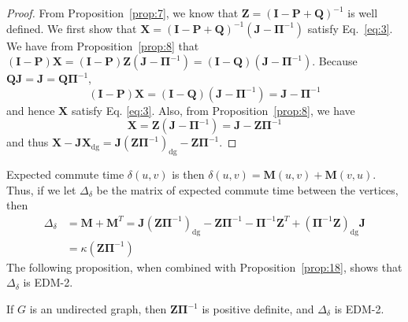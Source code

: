 \begin{proof}
  From Proposition~\ref{prop:7}, we know that $\mathbf{Z} =
  (\mathbf{I} - \mathbf{P} + \mathbf{Q})^{-1}$ is well defined.  We
  first show that $\mathbf{X} = (\mathbf{I} - \mathbf{P} +
  \mathbf{Q})^{-1}(\mathbf{J} - \bm{\Pi}^{-1})$ satisfy
  Eq.~\eqref{eq:3}. We have from Proposition~\ref{prop:8} that
  $(\mathbf{I} - \mathbf{P})\mathbf{X} = (\mathbf{I} -
  \mathbf{P})\mathbf{Z}(\mathbf{J} - \bm{\Pi}^{-1}) = (\mathbf{I} -
  \mathbf{Q})(\mathbf{J} - \bm{\Pi}^{-1})$. Because 
  $\mathbf{Q}\mathbf{J} = \mathbf{J} = \mathbf{Q}\bm{\Pi}^{-1}$,
  \begin{equation}
    \label{eq:27}
    (\mathbf{I} - \mathbf{P})\mathbf{X} =(\mathbf{I} - \mathbf{Q})(\mathbf{J} -
  \bm{\Pi}^{-1}) = \mathbf{J} - \bm{\Pi}^{-1}
  \end{equation}
  and hence $\mathbf{X}$ satisfy Eq. \eqref{eq:3}. Also, from
  Proposition~\ref{prop:8}, we have
  \begin{equation}
    \label{eq:31}
    \mathbf{X} = \mathbf{Z}(\mathbf{J} - \bm{\Pi}^{-1}) = \mathbf{J} -
    \mathbf{Z}\bm{\Pi}^{-1}
  \end{equation}
  and thus $\mathbf{X} - \mathbf{J}\mathbf{X}_{\mathrm{dg}} =
  \mathbf{J}(\mathbf{Z}\bm{\Pi}^{-1})_{\mathrm{dg}} - \mathbf{Z}\bm{\Pi}^{-1}$. 
\end{proof}
Expected commute time $\delta(u,v)$ is then 
$\delta(u,v) = \mathbf{M}(u,v)
+ \mathbf{M}(v,u)$. Thus, if we let $\Delta_{\delta}$ be the
matrix of expected commute time between the vertices, then
\begin{equation}
  \label{eq:52}
  \begin{split}
    \Delta_\delta &= \mathbf{M} + \mathbf{M}^{T}
    = 
    \mathbf{J}(\mathbf{Z}\bm{\Pi}^{-1})_{\mathrm{dg}} - \mathbf{Z}\bm{\Pi}^{-1} -
    \bm{\Pi}^{-1}\mathbf{Z}^{T} +
    (\bm{\Pi}^{-1}\mathbf{Z})_{\mathrm{dg}}\mathbf{J} \\
    &= \kappa(\mathbf{Z}\bm{\Pi}^{-1})
  \end{split}
\end{equation}
The following proposition, when combined with
Proposition~\ref{prop:18}, shows that $\Delta_{\delta}$ is EDM-2.
\begin{proposition}
  \label{prop:10}
  If $G$ is an undirected graph, then $\mathbf{Z}\bm{\Pi}^{-1}$ is
  positive definite, and $\Delta_{\delta}$ is EDM-2.
\end{proposition}
